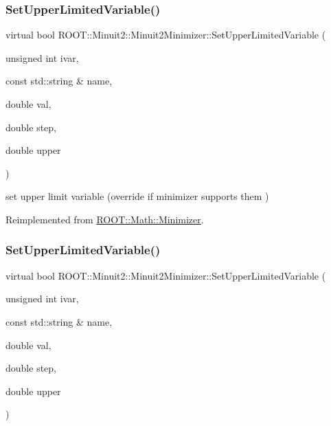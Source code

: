 \subsubsection{\texorpdfstring{SetUpperLimitedVariable()}{SetUpperLimitedVariable()}\hspace{0.1cm}{\footnotesize\ttfamily [1/3]}}
{\footnotesize\ttfamily virtual bool R\+O\+O\+T\+::\+Minuit2\+::\+Minuit2\+Minimizer\+::\+Set\+Upper\+Limited\+Variable (\begin{DoxyParamCaption}\item[{unsigned int}]{ivar,  }\item[{const std\+::string \&}]{name,  }\item[{double}]{val,  }\item[{double}]{step,  }\item[{double}]{upper }\end{DoxyParamCaption})\hspace{0.3cm}{\ttfamily [virtual]}}



set upper limit variable (override if minimizer supports them ) 



Reimplemented from \mbox{\hyperlink{classROOT_1_1Math_1_1Minimizer_a804843fbaea82809b3c54232d0c1fe86}{R\+O\+O\+T\+::\+Math\+::\+Minimizer}}.

\mbox{\label{classROOT_1_1Minuit2_1_1Minuit2Minimizer_a70209b37c419af5d8d1475ce8de29b43}} 
\subsubsection{\texorpdfstring{SetUpperLimitedVariable()}{SetUpperLimitedVariable()}\hspace{0.1cm}{\footnotesize\ttfamily [2/3]}}
{\footnotesize\ttfamily virtual bool R\+O\+O\+T\+::\+Minuit2\+::\+Minuit2\+Minimizer\+::\+Set\+Upper\+Limited\+Variable (\begin{DoxyParamCaption}\item[{unsigned int}]{ivar,  }\item[{const std\+::string \&}]{name,  }\item[{double}]{val,  }\item[{double}]{step,  }\item[{double}]{upper }\end{DoxyParamCaption})\hspace{0.3cm}{\ttfamily [virtual]}}



